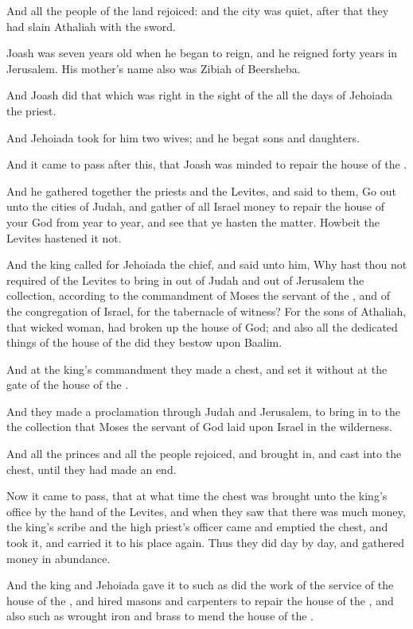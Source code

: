 \Verse And all the people of the land rejoiced: and the city was quiet, after that they had slain Athaliah with the sword.


\Chapter
\Verse Joash was seven years old when he began to reign, and he reigned forty years in Jerusalem. His mother's name also was Zibiah of Beersheba.

\Verse And Joash did that which was right in the sight of the \LORD all the days of Jehoiada the priest.

\Verse And Jehoiada took for him two wives; and he begat sons and daughters.

\Verse And it came to pass after this, that Joash was minded to repair the house of the \LORD.

\Verse And he gathered together the priests and the Levites, and said to them, Go out unto the cities of Judah, and gather of all Israel money to repair the house of your God from year to year, and see that ye hasten the matter. Howbeit the Levites hastened it not.

\Verse And the king called for Jehoiada the chief, and said unto him, Why hast thou not required of the Levites to bring in out of Judah and out of Jerusalem the collection, according to the commandment of Moses the servant of the \LORD, and of the congregation of Israel, for the tabernacle of witness?  \Verse For the sons of Athaliah, that wicked woman, had broken up the house of God; and also all the dedicated things of the house of the \LORD did they bestow upon Baalim.

\Verse And at the king's commandment they made a chest, and set it without at the gate of the house of the \LORD.

\Verse And they made a proclamation through Judah and Jerusalem, to bring in to the \LORD the collection that Moses the servant of God laid upon Israel in the wilderness.

\Verse And all the princes and all the people rejoiced, and brought in, and cast into the chest, until they had made an end.

\Verse Now it came to pass, that at what time the chest was brought unto the king's office by the hand of the Levites, and when they saw that there was much money, the king's scribe and the high priest's officer came and emptied the chest, and took it, and carried it to his place again. Thus they did day by day, and gathered money in abundance.

\Verse And the king and Jehoiada gave it to such as did the work of the service of the house of the \LORD, and hired masons and carpenters to repair the house of the \LORD, and also such as wrought iron and brass to mend the house of the \LORD.

